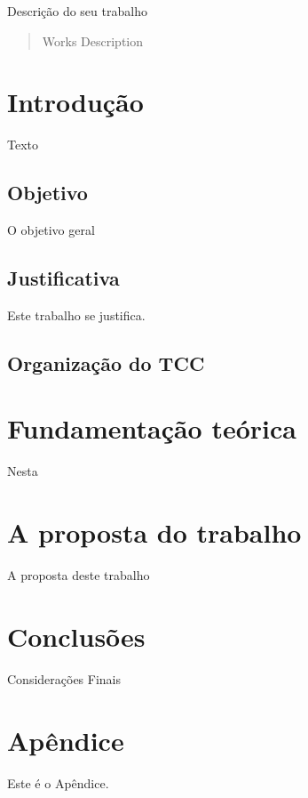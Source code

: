 \documentclass{bcc}
\begin{document}

\capa


\begin{resumo}
Descrição do seu trabalho
\end{resumo}

\begin{abstract}
Works Description
\end{abstract}

\renewcommand\contentsname{\centerline{Sumário}}
\renewcommand\listfigurename{\centerline{Lista de Figuras}}
\renewcommand\listtablename{\centerline{Lista de Tabelas}}

\tableofcontents

\listoffigures
{}

\listoftables
{}

\inicio
\chapter{Introdução}

Texto

\section {Objetivo}

O objetivo geral


\section{Justificativa}

Este trabalho se justifica.

\section{Organização do TCC}


\chapter{Fundamentação teórica}
\label{chap:fundamentacao}

Nesta 

\chapter{A proposta do trabalho}
\label{chap:sistema}
A proposta deste trabalho

\chapter{Conclusões}
\label{chap:conclusao}

Considerações Finais






\appendix
\chapter{Apêndice}\label{ane:relatorio}
Este é o Apêndice.
\end{document}
